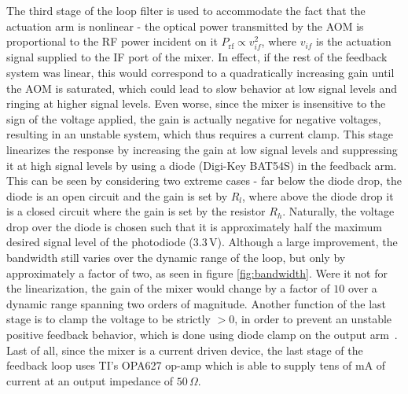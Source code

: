 \documentclass[twocolumn,aps,pra,showpacs,preprintnumbers,bibnotes]{revtex4-1}
\begin{document}
The third stage of the loop filter is used to accommodate the fact that the actuation arm is nonlinear - the optical power transmitted by the AOM is proportional to the RF power incident on it $P_{\mathrm{rf}}\propto v_{if}^2$, where $v_{if}$ is the actuation signal supplied to the IF port of the mixer.
In effect, if the rest of the feedback system was linear, this would correspond to a quadratically increasing gain until the AOM is saturated, which could lead to slow behavior at low signal levels and ringing at higher signal levels.
Even worse, since the mixer is insensitive to the sign of the voltage applied, the gain is actually negative for negative voltages, resulting in an unstable system, which thus requires a current clamp.
This stage linearizes the response by increasing the gain at low signal levels and suppressing it at high signal levels by using a diode (Digi-Key BAT54S) in the feedback arm.
This can be seen by considering two extreme cases - far below the diode drop, the diode is an open circuit and the gain is set by $R_l$, where above the diode drop it is a closed circuit where the gain is set by the resistor $R_h$. 
Naturally, the voltage drop over the diode is chosen such that it is approximately half the maximum desired signal level of the photodiode ($3.3\,$V).
Although a large improvement, the bandwidth still varies over the dynamic range of the loop, but only by approximately a factor of two, as seen in figure \ref{fig:bandwidth}.
Were it not for the linearization, the gain of the mixer would change by a factor of $10$ over a dynamic range spanning two orders of magnitude.
Another function of the last stage is to clamp the voltage to be strictly $>0$, in order to prevent an unstable positive feedback behavior, which is done using diode clamp on the output arm~\cite{Horowitz2015}.
Last of all, since the mixer is a current driven device, the last stage of the feedback loop uses TI's OPA627 op-amp which is able to supply tens of mA of current at an output impedance of $50\,\Omega$.
\end{document}
